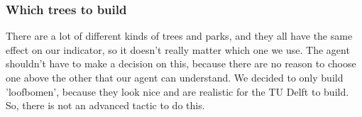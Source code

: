 \subsubsection{Which trees to build}
There are a lot of different kinds of trees and parks, and they all have the same effect on our indicator, so it doesn't really matter which one we use. The agent shouldn't have to make a decision on this, because there are no reason to choose one above the other that our agent can understand. We decided to only build 'loofbomen', because they look nice and are realistic for the TU Delft to build. So, there is not an advanced tactic to do this.

